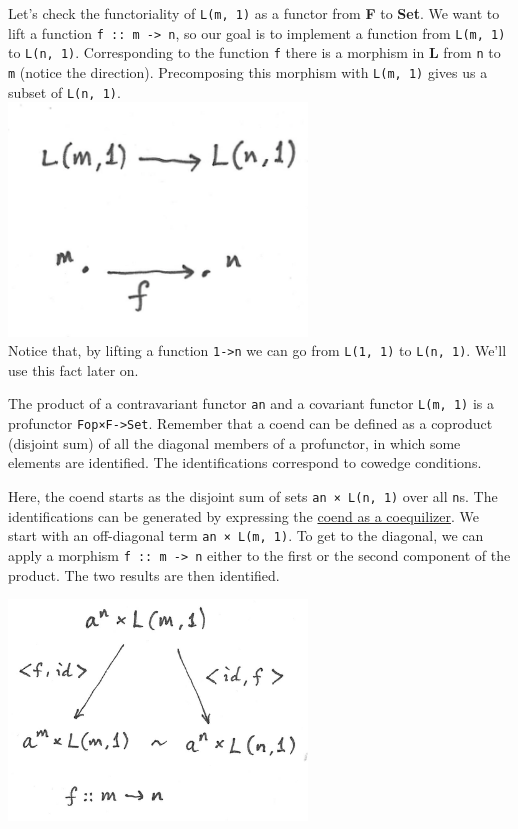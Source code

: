 Let's check the functoriality of \texttt{L(m,\ 1)} as a functor from
\textbf{F} to \textbf{Set}. We want to lift a function
\texttt{f\ ::\ m\ -\textgreater{}\ n}, so our goal is to implement a
function from \texttt{L(m,\ 1)} to \texttt{L(n,\ 1)}. Corresponding to
the function \texttt{f} there is a morphism in \textbf{L} from
\texttt{n} to \texttt{m} (notice the direction). Precomposing this
morphism with \texttt{L(m,\ 1)} gives us a subset of
\texttt{L(n,\ 1)}.\\
\includegraphics[width=3.12500in]{images/liftl.png}\\
Notice that, by lifting a function \texttt{1-\textgreater{}n} we can go
from \texttt{L(1,\ 1)} to \texttt{L(n,\ 1)}. We'll use this fact later
on.

The product of a contravariant functor \texttt{an} and a covariant
functor \texttt{L(m,\ 1)} is a profunctor
\texttt{Fop×F-\textgreater{}Set}. Remember that a coend can be defined
as a coproduct (disjoint sum) of all the diagonal members of a
profunctor, in which some elements are identified. The identifications
correspond to cowedge conditions.

Here, the coend starts as the disjoint sum of sets
\texttt{an\ ×\ L(n,\ 1)} over all \texttt{n}s. The identifications can
be generated by expressing the
\href{https://bartoszmilewski.com/2017/03/29/ends-and-coends/}{coend as
a coequilizer}. We start with an off-diagonal term
\texttt{an\ ×\ L(m,\ 1)}. To get to the diagonal, we can apply a
morphism \texttt{f\ ::\ m\ -\textgreater{}\ n} either to the first or
the second component of the product. The two results are then
identified.

\includegraphics[width=3.12500in]{images/equalize1.png}

